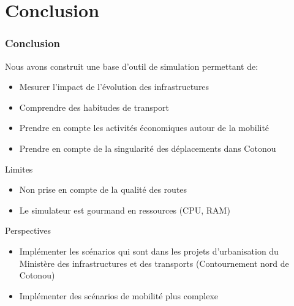 \section{Conclusion}
\begin{frame}
    \frametitle{Conclusion}
    Nous avons construit une base d'outil de simulation permettant de:
    \begin{itemize}
        \item {} Mesurer l'impact de l'évolution des infrastructures
        \item {} Comprendre des habitudes de transport
        \item {} Prendre en compte les activités économiques autour de la mobilité
        \item {} Prendre en compte de la singularité des déplacements dans Cotonou
    \end{itemize}


    \begin{alertblock}{Limites}
        \begin{itemize}
            \item Non prise en compte de la qualité des routes
            \item Le simulateur est gourmand en ressources (CPU, RAM)
        \end{itemize}
    \end{alertblock}

    \begin{block}{Perspectives}
        \begin{itemize}
            \item Implémenter les scénarios qui sont dans les projets d'urbanisation du Ministère des infrastructures et des transports (Contournement nord de Cotonou)
            \item Implémenter des scénarios de mobilité plus complexe
        \end{itemize}
    \end{block}
\end{frame}

%

